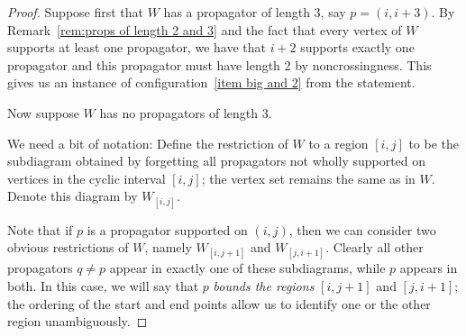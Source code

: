 \documentclass[11pt]{article}
\theoremstyle{remark}
\theoremstyle{definition}
\begin{document}
\begin{proof}
Suppose first that $W$ has a propagator of length $3$, say $p=(i, i+3)$.  By Remark~\ref{rem:props of length 2 and 3} and the fact that every vertex of $W$ supports at least one propagator, we have that $i+2$ supports exactly one propagator and this propagator must have length 2 by noncrossingness.  This gives us an instance of configuration~\ref{item big and 2} from the statement.

Now suppose $W$ has no propagators of length $3$.
%
%
%
%
%
%
%

We need a bit of notation:
Define the restriction of $W$ to a region $[i,j]$ to be the subdiagram obtained by forgetting all propagators not wholly supported on vertices in the cyclic interval $[i,j]$; the vertex set remains the same as in $W$.  Denote this diagram by $W_{[i,j]}$.

Note that if $p$ is a propagator supported on $(i,j)$, then we can consider two obvious restrictions of $W$, namely $W_{[i,j+1]}$ and $W_{[j,i+1]}$.  Clearly all other propagators $q\neq p$ appear in exactly one of these subdiagrams, while $p$ appears in both.  In this case, we will say that $p$ \textit{bounds the regions} $[i,j+1]$ and $[j,i+1]$; the ordering of the start and end points allow us to identify one or the other region unambiguously.


\end{proof}
\end{document}
